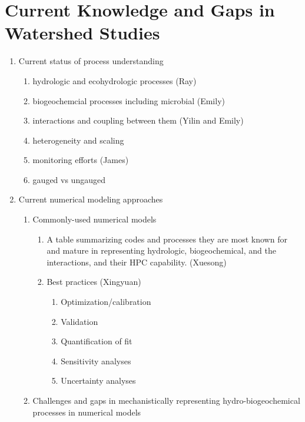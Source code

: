 \documentclass[preprint,review, 12pt]{elsarticle}
\begin{document}
\section{Current Knowledge and Gaps in Watershed Studies}
    \begin{enumerate}
    \item Current status of process understanding 
         \begin{enumerate}
            \item hydrologic and ecohydrologic processes (Ray)
            \item biogeochemcial processes including microbial (Emily)
            \item interactions and coupling between them (Yilin and Emily)
            \item heterogeneity and scaling
            \item monitoring efforts (James)
            \item gauged vs ungauged
        \end{enumerate}
    \item Current numerical modeling approaches
        \begin{enumerate}
        \item Commonly-used numerical models
            \begin{enumerate}
                \item A table summarizing codes and processes they are most known for and mature in representing hydrologic, biogeochemical, and the interactions, and their HPC capability. (Xuesong)
                \item Best practices (Xingyuan)
                    \begin{enumerate}
                        \item Optimization/calibration
                        \item Validation
                        \item Quantification of fit
                        \item Sensitivity analyses
                        \item Uncertainty analyses
                    \end{enumerate}
                \end{enumerate}    
        \item Challenges and gaps in mechanistically representing hydro-biogeochemical processes in numerical models
            \begin{enumerate}

\end{enumerate}
\end{enumerate}
\end{enumerate}
\end{document}

